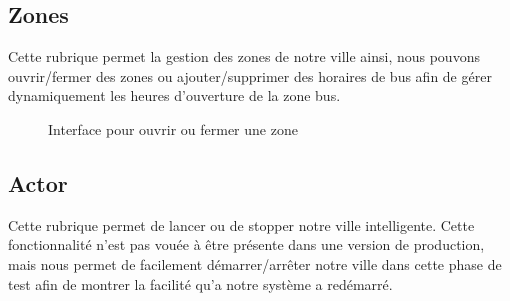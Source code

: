 \subsection{Zones}
Cette rubrique permet la gestion des zones de notre ville ainsi, nous pouvons ouvrir/fermer des zones ou ajouter/supprimer des horaires de bus afin de gérer dynamiquement les heures d’ouverture de la zone bus. 
\begin{figure}[H]
    \begin{center}
        \caption{Interface pour ouvrir ou fermer une zone}
    \end{center}
\end{figure}

\subsection{Actor}
Cette rubrique permet de lancer ou de stopper notre ville intelligente. Cette fonctionnalité n’est pas vouée à être présente dans une version de production, mais nous permet de facilement démarrer/arrêter notre ville dans cette phase de test afin de montrer la facilité qu’a notre système a redémarré.

